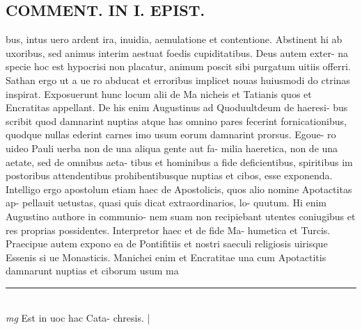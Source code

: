 \documentclass{article}
\begin{document}
\begin{pages}
\section*{COMMENT. IN I. EPIST. }\pstart bus, intus uero ardent ira, inuidia, aemulatione et contentione. Abstinent hi ab uxoribus, sed animus interim aestuat foedis cupiditatibus. Deus autem exter- na specie hoc est hypocrisi non placatur, animum poscit sibi purgatum uitiis offerri. Sathan ergo ut a ue ro abducat et erroribus implicet nouas huiusmodi do ctrinas inspirat. Exposuerunt hunc locum alii de Ma nicheis et Tatianis quos et Encratitas appellant. De his enim Augustinus ad Quoduultdeum de haeresi- bus scribit quod damnarint nuptias atque has omnino pares fecerint fornicationibus, quodque nullas ederint carnes imo usum eorum damnarint prorsus. Egoue- ro uideo Pauli uerba non de una aliqua gente aut fa- milia haeretica, non de una aetate, sed de omnibus aeta- tibus et hominibus a fide deficientibus, spiritibus im postoribus attendentibus prohibentibusque nuptias et cibos, esse exponenda. Intelligo ergo apostolum etiam haec de Apostolicis, quos alio nomine Apotactitas ap- pellauit uetustas, quasi quis dicat extraordinarios, lo- quutum. Hi enim Augustino authore in communio- nem suam non recipiebant utentes coniugibus et res proprias possidentes. Interpretor haec et de fide Ma- humetica et Turcis. Praecipue autem expono ea de Pontifitiis et nostri saeculi religiosis uirisque Essenis si ue Monasticis. Manichei enim et Encratitae una cum Apotactitis damnarunt nuptias et ciborum usum ma  \pend
\vspace{0.5cm}\noindent
\vspace{0.2cm}\rule{1cm}{0.2pt}\\ 
\hspace{0.2cm}\textit{mg}
\footnotesize Est in uoc hac Cata- chresis. 
\normalsize| 

\end{pages}
\end{document}
